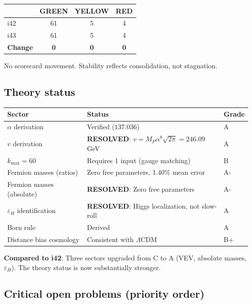 \documentclass[11pt,a4paper]{article}
\newcommand{\GREEN}{\textcolor{dfdgreen}{\textbf{GREEN}}}
\newcommand{\YELLOW}{\textcolor{dfdyellow}{\textbf{YELLOW}}}
\newcommand{\RED}{\textcolor{dfdred}{\textbf{RED}}}
\newcommand{\RESOLVED}{\textcolor{dfdgreen}{\textbf{RESOLVED}}}
\begin{document}
\begin{center}
\begin{tabular}{lccc}
\toprule
& \textbf{\GREEN} & \textbf{\YELLOW} & \textbf{\RED} \\
\midrule
i42 & 61 & 5 & 4 \\
i43 & 61 & 5 & 4 \\
\textbf{Change} & \textbf{0} & \textbf{0} & \textbf{0} \\
\bottomrule
\end{tabular}
\end{center}

No scorecard movement. Stability reflects consolidation, not stagnation.

\subsection{Theory status}

\begin{center}
\begin{tabular}{lll}
\toprule
\textbf{Sector} & \textbf{Status} & \textbf{Grade} \\
\midrule
$\alpha$ derivation & Verified ($137.036$) & A \\
$v$ derivation & \RESOLVED{}: $v = M_P \alpha^8 \sqrt{2\pi} = 246.09$ GeV & A \\
$k_{\max} = 60$ & Requires 1 input (gauge matching) & B \\
Fermion masses (ratios) & Zero free parameters, 1.40\% mean error & A- \\
Fermion masses (absolute) & \RESOLVED{}: Zero free parameters & A- \\
$\varepsilon_H$ identification & \RESOLVED{}: Higgs localization, not slow-roll & A \\
Born rule & Derived & A \\
Distance bias cosmology & Consistent with $\Lambda$CDM & B+ \\
\bottomrule
\end{tabular}
\end{center}

\textbf{Compared to i42}: Three sectors upgraded from C to A (VEV, absolute masses, $\varepsilon_H$). The theory status is now substantially stronger.

\subsection{Critical open problems (priority order)}
\end{document}
